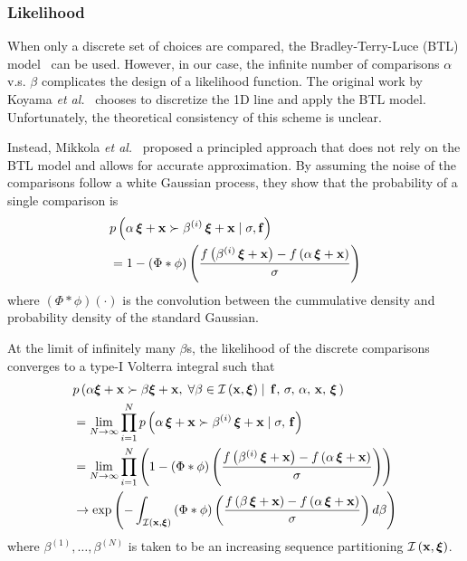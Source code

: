 \subsubsection{Likelihood}
When only a discrete set of choices are compared, the Bradley-Terry-Luce (BTL) model~\cite{10.1145/3072959.3073598} can be used.
However, in our case, the infinite number of comparisons \(\alpha\) v.s. \(\beta\) complicates the design of a likelihood function.
The original work by Koyama \textit{et al.}~\cite{koyama_sequential_2020} chooses to discretize the 1D line and apply the BTL model.
Unfortunately, the theoretical consistency of this scheme is unclear.

Instead, Mikkola \textit{et al.}~\cite{pmlr-v119-mikkola20a} proposed a principled approach that does not rely on the BTL model and allows for accurate approximation.
By assuming the noise of the comparisons follow a white Gaussian process, they show that the probability of a single comparison is
\begin{align}
  &p\left(\alpha \, \bm{\xi} + \mathbf{x} \succ \beta^{(i)} \, \bm{\xi} + \mathbf{x} \mid \sigma, \mathbf{f} \right) \nonumber\\
  &= 1 - \left(\Phi * \phi \right)\left( \frac{ f\left(\beta^{(i)} \, \bm{\xi} + \mathbf{x} \right) - f\left(\alpha \, \bm{\xi} + \mathbf{x} \right) }{\sigma} \right)
\end{align}
{\noindent}where \(\left(\Phi*\phi\right)\left(\cdot\right)\) is the convolution between the cummulative density and probability density of the standard Gaussian. 

At the limit of infinitely many \(\beta\)s, the likelihood of the discrete comparisons converges to a type-I Volterra integral such that
{\small
\begin{align}
  &p\left(\alpha \bm{\xi} + \mathbf{x} \succ \beta \bm{\xi} + \mathbf{x},\; \forall \beta \in \mathcal{I}\left(\mathbf{x}, \bm{\xi}\right) \mid\, \mathbf{f},\, \sigma,\, \alpha,\, \mathbf{x},\, \bm{\xi}\,\right) \nonumber \\
  &= \lim_{N \rightarrow \infty} \prod^{N}_{i=1} p\left(\alpha \, \bm{\xi} + \mathbf{x} \succ \beta^{(i)} \, \bm{\xi} + \mathbf{x} \mid \sigma,\, \mathbf{f} \right) \\
  &= \lim_{N \rightarrow \infty} \prod^{N}_{i=1} \left(  1 - \left(\Phi * \phi \right)\left( \frac{ f\left(\beta^{(i)} \, \bm{\xi} + \mathbf{x} \right) - f\left(\alpha \, \bm{\xi} + \mathbf{x} \right) }{\sigma} \right) \right) \\
  &\rightarrow \exp\left(  - \int_{\mathcal{I}\left(\mathbf{x}, \bm{\xi}\right)} \left(\Phi * \phi \right) \left( \frac{ f\left(\beta \, \bm{\xi} + \mathbf{x} \right) - f\left(\alpha \, \bm{\xi} + \mathbf{x} \right) }{\sigma} \right) d\beta \right)
\end{align}
}%
%
{\noindent}where \(\beta^{(1)}, \ldots, \beta^{(N)}\) is taken to be an increasing sequence partitioning \(\mathcal{I\left(\mathbf{x}, \bm{\xi}\right)}\).

